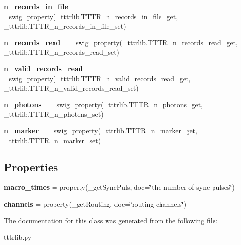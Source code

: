 \begin{DoxyCompactItemize}
{\bfseries n\+\_\+records\+\_\+in\+\_\+file} = \+\_\+swig\+\_\+property(\+\_\+tttrlib.\+T\+T\+T\+R\+\_\+n\+\_\+records\+\_\+in\+\_\+file\+\_\+get, \+\_\+tttrlib.\+T\+T\+T\+R\+\_\+n\+\_\+records\+\_\+in\+\_\+file\+\_\+set)
\item 
\mbox{\label{classtttrlib_1_1_t_t_t_r_a8cb1bc8ca25dc930a9cfb05670607145}} 
{\bfseries n\+\_\+records\+\_\+read} = \+\_\+swig\+\_\+property(\+\_\+tttrlib.\+T\+T\+T\+R\+\_\+n\+\_\+records\+\_\+read\+\_\+get, \+\_\+tttrlib.\+T\+T\+T\+R\+\_\+n\+\_\+records\+\_\+read\+\_\+set)
\item 
\mbox{\label{classtttrlib_1_1_t_t_t_r_adcee291af42b1e857dd1890cc829ffd1}} 
{\bfseries n\+\_\+valid\+\_\+records\+\_\+read} = \+\_\+swig\+\_\+property(\+\_\+tttrlib.\+T\+T\+T\+R\+\_\+n\+\_\+valid\+\_\+records\+\_\+read\+\_\+get, \+\_\+tttrlib.\+T\+T\+T\+R\+\_\+n\+\_\+valid\+\_\+records\+\_\+read\+\_\+set)
\item 
\mbox{\label{classtttrlib_1_1_t_t_t_r_a77b662b1d73fc6b3a80f13f375ab7a62}} 
{\bfseries n\+\_\+photons} = \+\_\+swig\+\_\+property(\+\_\+tttrlib.\+T\+T\+T\+R\+\_\+n\+\_\+photons\+\_\+get, \+\_\+tttrlib.\+T\+T\+T\+R\+\_\+n\+\_\+photons\+\_\+set)
\item 
\mbox{\label{classtttrlib_1_1_t_t_t_r_ad57043f19408367a71cde4d53122f468}} 
{\bfseries n\+\_\+marker} = \+\_\+swig\+\_\+property(\+\_\+tttrlib.\+T\+T\+T\+R\+\_\+n\+\_\+marker\+\_\+get, \+\_\+tttrlib.\+T\+T\+T\+R\+\_\+n\+\_\+marker\+\_\+set)
\end{DoxyCompactItemize}
\subsection*{Properties}
\begin{DoxyCompactItemize}
\item 
\mbox{\label{classtttrlib_1_1_t_t_t_r_ac1fcfc50b239f119d9f7700641a3fa58}} 
{\bfseries macro\+\_\+times} = property(\+\_\+get\+Sync\+Puls, doc=\char`\"{}the number of sync pulses\char`\"{})
\item 
\mbox{\label{classtttrlib_1_1_t_t_t_r_a9c926164e4d279a1f74f3505e8c0f09e}} 
{\bfseries channels} = property(\+\_\+get\+Routing, doc=\char`\"{}routing channels\char`\"{})
\end{DoxyCompactItemize}


The documentation for this class was generated from the following file\+:\begin{DoxyCompactItemize}
\item 
tttrlib.\+py\end{DoxyCompactItemize}
